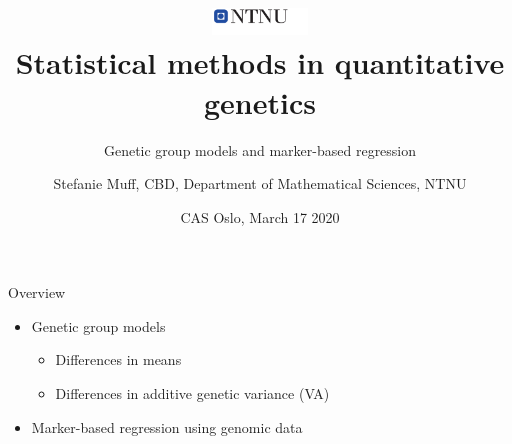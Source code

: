 \documentclass[10pt,ignorenonframetext,]{beamer}
\title{\includegraphics[width=1in,height=\textheight]{logo_ntnu.png}\\
Statistical methods in quantitative genetics}
\subtitle{Genetic group models and marker-based regression}
\author{Stefanie Muff, CBD, Department of Mathematical Sciences, NTNU}
\date{CAS Oslo, March 17 2020}
\providecommand{\tightlist}{%
  \setlength{\itemsep}{0pt}\setlength{\parskip}{0pt}}
\begin{document}
\frame{\titlepage}

\begin{frame}

\begin{block}{Overview}

\vspace{3mm}

\begin{itemize}
\tightlist
\item
  Genetic group models

  \begin{itemize}
  \tightlist
  \item
    Differences in means
  \item
    Differences in additive genetic variance (VA)
  \end{itemize}
\end{itemize}

\vspace{2mm}

\begin{itemize}
\tightlist
\item
  Marker-based regression using genomic data
\end{itemize}

\end{block}

\end{frame}
\end{document}
